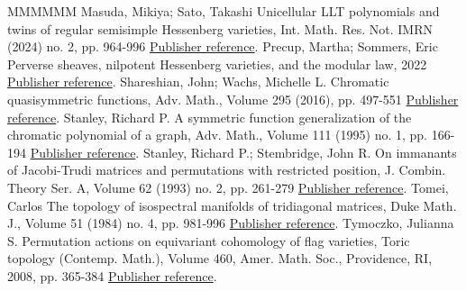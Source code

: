 \begin{thebibliography}{MMMMMM}
 Masuda, Mikiya; Sato, Takashi Unicellular LLT polynomials and twins of regular semisimple Hessenberg varieties, Int. Math. Res. Not. IMRN (2024) no. 2, pp. 964-996 \href{https://alco.centre-mersenne.org/articles/10.5802/alco.349/#MS}{Publisher reference}.
 Precup, Martha; Sommers, Eric Perverse sheaves, nilpotent Hessenberg varieties, and the modular law, 2022 \href{https://alco.centre-mersenne.org/articles/10.5802/alco.349/#PS}{Publisher reference}.
 Shareshian, John; Wachs, Michelle L. Chromatic quasisymmetric functions, Adv. Math., Volume 295 (2016), pp. 497-551 \href{https://alco.centre-mersenne.org/articles/10.5802/alco.349/#SW}{Publisher reference}.
 Stanley, Richard P. A symmetric function generalization of the chromatic polynomial of a graph, Adv. Math., Volume 111 (1995) no. 1, pp. 166-194 \href{https://alco.centre-mersenne.org/articles/10.5802/alco.349/#Sta}{Publisher reference}.
 Stanley, Richard P.; Stembridge, John R. On immanants of Jacobi-Trudi matrices and permutations with restricted position, J. Combin. Theory Ser. A, Volume 62 (1993) no. 2, pp. 261-279 \href{https://alco.centre-mersenne.org/articles/10.5802/alco.349/#SS}{Publisher reference}.
 Tomei, Carlos The topology of isospectral manifolds of tridiagonal matrices, Duke Math. J., Volume 51 (1984) no. 4, pp. 981-996 \href{https://alco.centre-mersenne.org/articles/10.5802/alco.349/#Tom}{Publisher reference}.
 Tymoczko, Julianna S. Permutation actions on equivariant cohomology of flag varieties, Toric topology (Contemp. Math.), Volume 460, Amer. Math. Soc., Providence, RI, 2008, pp. 365-384 \href{https://alco.centre-mersenne.org/articles/10.5802/alco.349/#Tym}{Publisher reference}.
\end{thebibliography}
